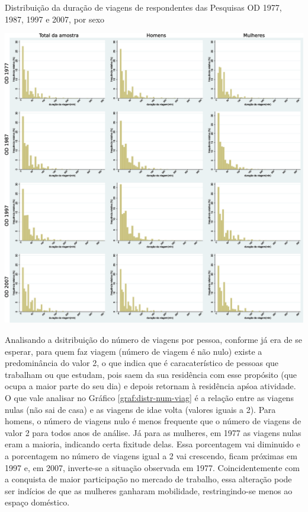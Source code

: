 \begin{grafico}[htb]%
    \caption{\label{graf:distr-dur-viag}Distribuição da duração de viagens de respondentes das Pesquisas OD 1977, 1987, 1997 e 2007, por sexo}%
    \begin{center}%
        \includegraphics[width=1.1\textwidth]{./imagens/duradeviagens2.eps}%
    \end{center}%
\end{grafico}%

\clearpage
Analisando a dsitribuição do número de viagens por pessoa, conforme já era de se esperar, para quem faz viagem (número de viagem é não nulo) existe a predominância do valor 2, o que indica que é caracaterístico de pessoas que trabalham ou que estudam, pois saem da sua residência com esse propósito (que ocupa a maior parte do seu dia) e depois retornam à residência apśoa atividade. O que vale analisar no Gráfico \ref{graf:distr-num-viag} é a relação entre as viagens nulas (não sai de casa) e as viagens de idae volta (valores iguais a 2). Para homens, o número de viagens nulo é menos frequente que o número de viagens de valor 2 para todos anos de análise. Já para as mulheres, em 1977 as viagens nulas eram a maioria, indicando certa fixitude delas. Essa porcentagem vai diminuido e a porcentagem no número de viagens igual a 2 vai crescendo, ficam próximas em 1997 e, em 2007, inverte-se a situação observada em 1977. Coincidentemente com a conquista de maior participação no mercado de trabalho, essa alteração pode ser indícios de que as mulheres ganharam mobilidade, restringindo-se menos ao espaço doméstico.

